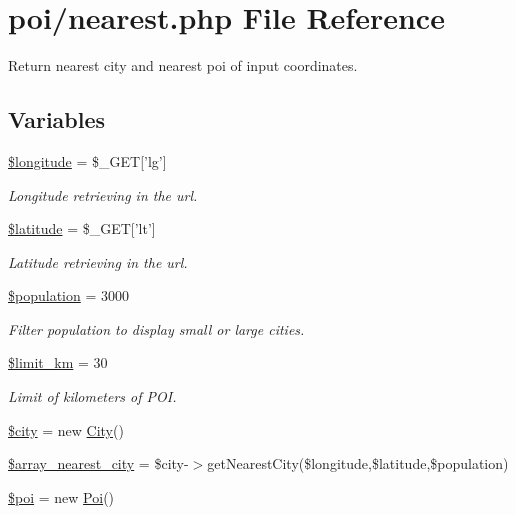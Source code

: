 \hypertarget{nearest_8php}{\section{poi/nearest.php File Reference}
\label{nearest_8php}
}


Return nearest city and nearest poi of input coordinates.  


\subsection*{Variables}
\begin{DoxyCompactItemize}
\item 
\hyperlink{nearest_8php_aabb5b5c018fed3789fce382e336cfa47}{\$longitude} = \$\-\_\-\-G\-E\-T\mbox{[}'lg'\mbox{]}
\begin{DoxyCompactList}\small\item\em Longitude retrieving in the url. \end{DoxyCompactList}\item 
\hyperlink{nearest_8php_a5635a7326fb0b96e184ca6f5baa13e94}{\$latitude} = \$\-\_\-\-G\-E\-T\mbox{[}'lt'\mbox{]}
\begin{DoxyCompactList}\small\item\em Latitude retrieving in the url. \end{DoxyCompactList}\item 
\hyperlink{nearest_8php_afc1939ed7d0e8629546e2bc27b02dbc1}{\$population} = 3000
\begin{DoxyCompactList}\small\item\em Filter population to display small or large cities. \end{DoxyCompactList}\item 
\hyperlink{nearest_8php_a00de150c5780d1d74512d2f6c6477d22}{\$limit\-\_\-km} = 30
\begin{DoxyCompactList}\small\item\em Limit of kilometers of P\-O\-I. \end{DoxyCompactList}\item 
\hyperlink{nearest_8php_a5b9ddd3e3a69d8901270064346bdef49}{\$city} = new \hyperlink{class_city}{City}()
\item 
\hyperlink{nearest_8php_ad20bfb1568497d36431fbd90847417cc}{\$array\-\_\-nearest\-\_\-city} = \$city-\/$>$get\-Nearest\-City(\$longitude,\$latitude,\$population)
\item 
\hyperlink{nearest_8php_a15278c25ad2a899afd235d0093857e4c}{\$poi} = new \hyperlink{class_poi}{Poi}()

\end{DoxyCompactItemize}
